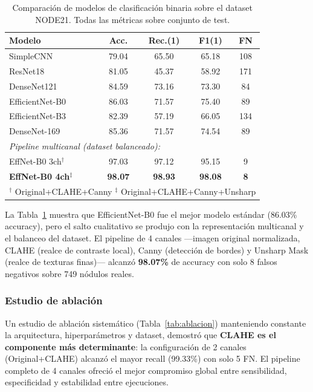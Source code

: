 \documentclass[conference]{IEEEtran}
\begin{document}
\begin{table}[!t]
\centering
\caption{Comparación de modelos de clasificación binaria sobre el dataset NODE21. Todas las métricas sobre conjunto de test.}
\label{tab:clasificacion}
\renewcommand{\arraystretch}{1.1}
\begin{tabular}{lcccc}
\toprule
\textbf{Modelo} & \textbf{Acc.} & \textbf{Rec.(1)} & \textbf{F1(1)} & \textbf{FN} \\
\midrule
SimpleCNN & 79.04 & 65.50 & 65.18 & 108 \\
ResNet18 & 81.05 & 45.37 & 58.92 & 171 \\
DenseNet121 & 84.59 & 73.16 & 73.30 & 84 \\
EfficientNet-B0 & 86.03 & 71.57 & 75.40 & 89 \\
EfficientNet-B3 & 82.39 & 57.19 & 66.05 & 134 \\
DenseNet-169 & 85.36 & 71.57 & 74.54 & 89 \\
\midrule
\multicolumn{5}{l}{\textit{Pipeline multicanal (dataset balanceado):}} \\
EffNet-B0 3ch$^\dagger$ & 97.03 & 97.12 & 95.15 & 9 \\
\textbf{EffNet-B0 4ch$^\ddagger$} & \textbf{98.07} & \textbf{98.93} & \textbf{98.08} & \textbf{8} \\
\bottomrule
\multicolumn{5}{l}{\scriptsize $^\dagger$ Original+CLAHE+Canny \quad $^\ddagger$ Original+CLAHE+Canny+Unsharp} \\
\end{tabular}
\end{table}

La Tabla~\ref{tab:clasificacion} muestra que EfficientNet-B0 fue el mejor modelo estándar (86.03\% accuracy), pero el salto cualitativo se produjo con la representación multicanal y el balanceo del dataset. El pipeline de 4 canales —imagen original normalizada, CLAHE (realce de contraste local), Canny (detección de bordes) y Unsharp Mask (realce de texturas finas)— alcanzó \textbf{98.07\%} de accuracy con solo 8 falsos negativos sobre 749 nódulos reales.

\subsubsection{Estudio de ablación}

Un estudio de ablación sistemático (Tabla~\ref{tab:ablacion}) manteniendo constante la arquitectura, hiperparámetros y dataset, demostró que \textbf{CLAHE es el componente más determinante}: la configuración de 2 canales (Original+CLAHE) alcanzó el mayor recall (99.33\%) con solo 5 FN. El pipeline completo de 4 canales ofreció el mejor compromiso global entre sensibilidad, especificidad y estabilidad entre ejecuciones.
\end{document}
